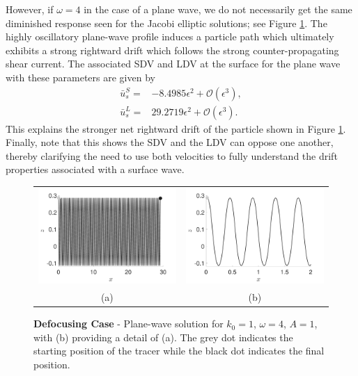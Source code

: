 \documentclass{JFM_Style/jfm}
\begin{document}
However, if $\omega=4$ in the case of a plane wave, we do not necessarily get the same diminished response seen for the Jacobi elliptic solutions; see Figure \ref{fig:defoc_pwave}.  The highly oscillatory plane-wave profile induces a particle path which ultimately exhibits a strong rightward drift which follows the strong counter-propagating shear current.   The associated SDV and LDV at the surface for the plane wave with these parameters are given by
\begin{align*}
\bar{u}^{S}_{s} = & -8.4985\epsilon^{2} + \mathcal{O}(\epsilon^{3}),\\
\bar{u}^{L}_{s} = & 29.2719\epsilon^{2} + \mathcal{O}(\epsilon^{3}).
\end{align*}
This explains the stronger net rightward drift of the particle shown in Figure \ref{fig:defoc_pwave}.  Finally, note that this shows the SDV and the LDV can oppose one another, thereby clarifying the need to use both velocities to fully understand the drift properties associated with a surface wave.
 \begin{figure}
\centering
\begin{tabular}{cc}
\includegraphics[width=.5\textwidth]{om_val_4_k0_1_ep_pt1_defoc_ztrack_pwave} & \includegraphics[width=.5\textwidth]{om_val_4_k0_1_ep_pt1_defoc_ztrack_pwave_detail}\\
(a) & (b)
\end{tabular}
\caption{\small {\bf Defocusing Case} - Plane-wave solution for $k_{0}=1$, $\omega=4$, $A=1$, with (b) providing a detail of (a).  The grey dot indicates the starting position of the tracer while the black dot indicates the final position.}
\label{fig:defoc_pwave}
\end{figure}
\end{document}
